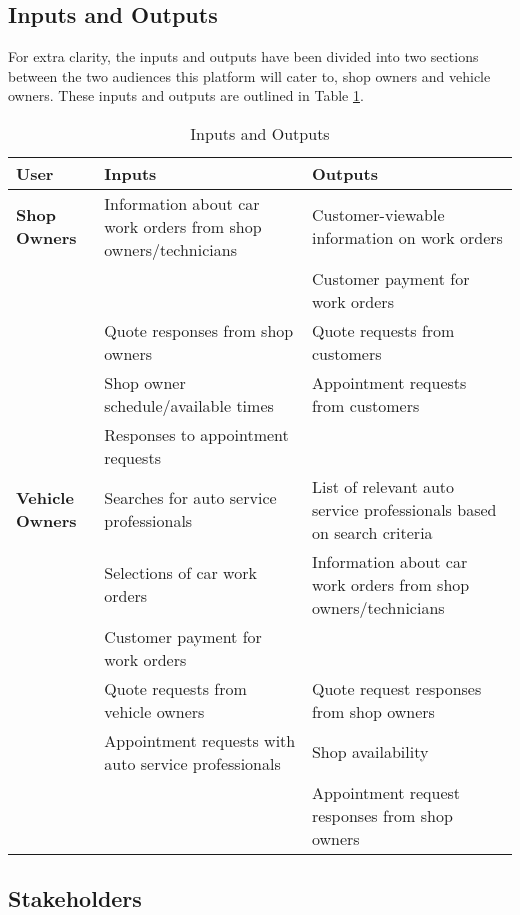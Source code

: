 \documentclass{article}
\begin{document}
\subsection{Inputs and Outputs}


For extra clarity, the inputs and outputs have been divided into two sections between the two audiences this platform will cater to, shop owners and vehicle owners. These inputs and outputs are outlined in Table \ref{tab:inputsOutputs}.

\begin{center}
\begin{longtable}{ | p{3cm} | p{4cm} | p{4cm} |}
\caption{Inputs and Outputs}
\label{tab:inputsOutputs}
\\ \hline
\textbf{User} & \textbf{Inputs} & \textbf{Outputs} \\ \hline
\textbf{Shop Owners} & Information about car work orders from shop owners/technicians & Customer-viewable information on work orders \\ \hline
& & Customer payment for work orders \\ \cline{2-3}
& Quote responses from shop owners & Quote requests from customers \\ \cline{2-3}
& Shop owner schedule/available times & Appointment requests from customers \\ \cline{2-3}
& Responses to appointment requests & \\ \hline
\textbf{Vehicle Owners} & Searches for auto service professionals & List of relevant auto service professionals based on search criteria \\ \cline{2-3}
& Selections of car work orders & Information about car work orders from shop owners/technicians \\ \cline{2-3}
& Customer payment for work orders & \\ \cline{2-3}
& Quote requests from vehicle owners & Quote request responses from shop owners \\ \cline{2-3}
& Appointment requests with auto service professionals & Shop availability \\ \cline{2-3}
& & Appointment request responses from shop owners \\ \hline
\end{longtable}
\end{center}

\subsection{Stakeholders}
\end{document}
